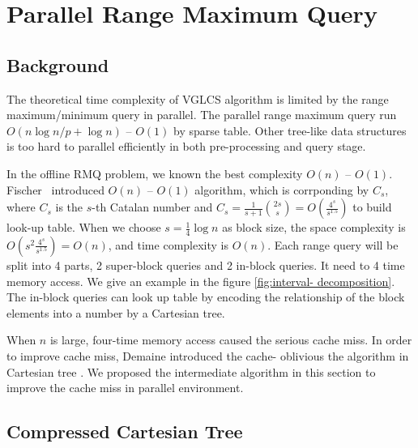 \section{Parallel Range Maximum Query}
\label{sec:parallelRMQ}

\subsection{Background}

The theoretical time complexity of VGLCS algorithm is limited by the
range maximum/minimum query in parallel.  The parallel range maximum
query run $O(n \log n / p + \log n)$ -- $O(1)$ by sparse table.  Other
tree-like data structures is too hard to parallel efficiently in both
pre-processing and query stage.  

In the offline RMQ problem, we known the best complexity $O(n)$ --
$O(1)$.  Fischer~\cite{Fischer2006TheoreticalAP} introduced $O(n)$ --
$O(1)$ algorithm, which is corrponding by $C_s$, where $C_s$ is the
$s$-th Catalan number and $C_s = \frac{1}{s+1}\binom{2s}{s} =
O(\frac{4^s}{s^{1.5}})$ to build look-up table.  When we choose $s =
\frac{1}{4} \log n$ as block size, the space complexity is $O(s^2
\frac{4^s}{s^{1.5}}) = O(n)$, and time complexity is $O(n)$.  Each range
query will be split into 4 parts, 2 super-block queries and 2 in-block
queries.  It need to 4 time memory access.  We give an example in the
figure \ref{fig:interval- decomposition}.  The in-block queries can look
up table by encoding the relationship of the block elements into a
number by a Cartesian tree.

When $n$ is large, four-time memory access caused the serious cache
miss.  In order to improve cache miss, Demaine introduced the cache-
oblivious the algorithm \cite{Demaine2009OnCT} in Cartesian tree
\cite{Vuillemin1980AUL}.  We proposed the intermediate algorithm in this section to improve the cache miss in parallel environment.

\subsection{Compressed Cartesian Tree}

\iffalse
在 Fischer \cite{fischer} 的論文中，
根據卡塔蘭數 $\frac{1}{s+1}\binom{2s}{s} = O(\frac{4^s}{s^{1.5}})$ 建立查找表 (lookup-table)，
其中選擇 $s = \frac{1}{4} \log n$ 時，空間複雜度 $O(s^2 \frac{4^s}{s^{1.5}}) = o(n)$ 且建表複雜度 $o(n)$。
每一個區間詢問將會拆成 2 個 super-block 和 2 個 in-block 詢問，共計需要 4 次的記憶體存取。
在理論分析上，離線 RMQ 問題可在 $\theta(n)$ -- $\theta(1)$ 時間內解決任一詢問。
當 $n$ 越大時，這 4 次的記憶體存取會遭遇到嚴重的快取未中 (cache miss)，
在 Demaine ~\cite{demaine} 的論文中，發展出快取忘卻 (cache oblivious) 形式的查找方案，
降低在離線版本中的 in-block 詢問產生的快取未中。
\fi

